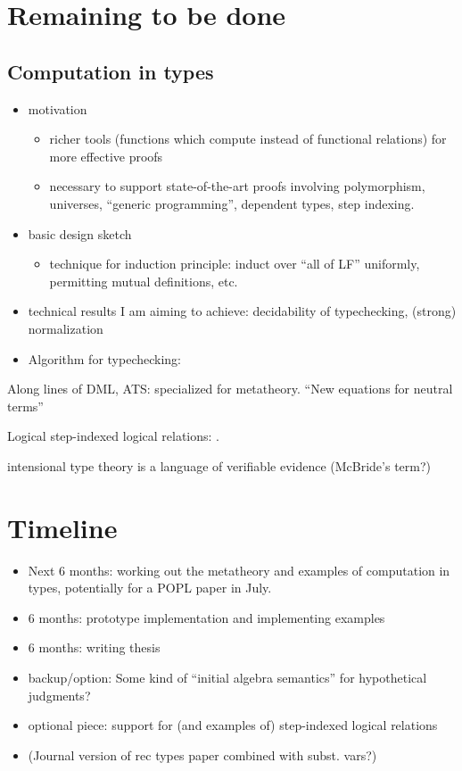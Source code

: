 \documentclass{article}
\begin{document}
\section{Remaining to be done}
\subsection{Computation in types}
\begin{itemize}
\item motivation
\begin{itemize}
\item richer tools (functions which compute instead of functional
relations) for more effective proofs
\item necessary to support state-of-the-art proofs involving polymorphism,
universes, ``generic programming'', dependent types, step indexing.
\end{itemize}
\item basic design sketch
\begin{itemize}
\item technique for induction principle: induct over ``all of LF'' uniformly, permitting mutual definitions, etc.
\end{itemize}
\item technical results I am aiming to achieve: decidability
  of typechecking, (strong) normalization
\item Algorithm for typechecking: \citep{Coquand91,Harper05,Abel11}
\end{itemize}

Along lines of DML, ATS: specialized for metatheory. ``New equations for neutral terms'' \cite{Allais13}

Logical step-indexed logical relations: \cite{Dreyer11}.

intensional type theory is a language of verifiable evidence (McBride's term?)
\section{Timeline}
\begin{itemize}
\item Next 6 months: working out the metatheory and examples of computation in
types, potentially for a POPL paper in July.
\item 6 months: prototype implementation and implementing examples
\item 6 months: writing thesis
\item backup/option: Some kind of ``initial algebra semantics'' for hypothetical judgments?
\item optional piece: support for (and examples of) step-indexed
  logical relations
\item (Journal version of rec types paper combined with subst. vars?)
\end{itemize}



\end{document}
